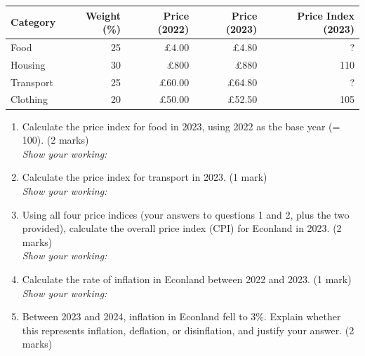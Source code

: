 \documentclass[12pt,a4paper]{article}
\begin{document}
\vspace{0.5em}

\begin{table}[h]
    \centering
    \renewcommand{\arraystretch}{1.3}
    \begin{tabular}{@{}lrrrr@{}}
        \toprule
        \textbf{Category} & \textbf{Weight (\%)} & \textbf{Price (2022)} & \textbf{Price (2023)} & \textbf{Price Index (2023)} \\ \midrule
        Food        & 25 & £4.00  & £4.80  & ?   \\
        Housing     & 30 & £800   & £880   & 110 \\
        Transport   & 25 & £60.00 & £64.80 & ?   \\
        Clothing    & 20 & £50.00 & £52.50 & 105 \\ \bottomrule
    \end{tabular}
\end{table}

\vspace{0.8em}

\begin{enumerate}[leftmargin=*, label=\textbf{\arabic*.}]

    \item Calculate the price index for food in 2023, using 2022 as the base year (= 100). \hfill (2 marks)\\[0.2em]
    \textit{Show your working:}
    \vspace{3cm}

    \item Calculate the price index for transport in 2023. \hfill (1 mark)\\[0.2em]
    \textit{Show your working:}
    \vspace{2cm}

    \item Using all four price indices (your answers to questions 1 and 2, plus the two provided), calculate the overall price index (CPI) for Econland in 2023. \hfill (2 marks)\\[0.2em]
    \textit{Show your working:}
    \vspace{3.5cm}

    \item Calculate the rate of inflation in Econland between 2022 and 2023. \hfill (1 mark)\\[0.2em]
    \textit{Show your working:}
    \vspace{2cm}

    \item Between 2023 and 2024, inflation in Econland fell to 3\%. Explain whether this represents inflation, deflation, or disinflation, and justify your answer. \hfill (2 marks)\\[4cm]

\end{enumerate}
\end{document}
